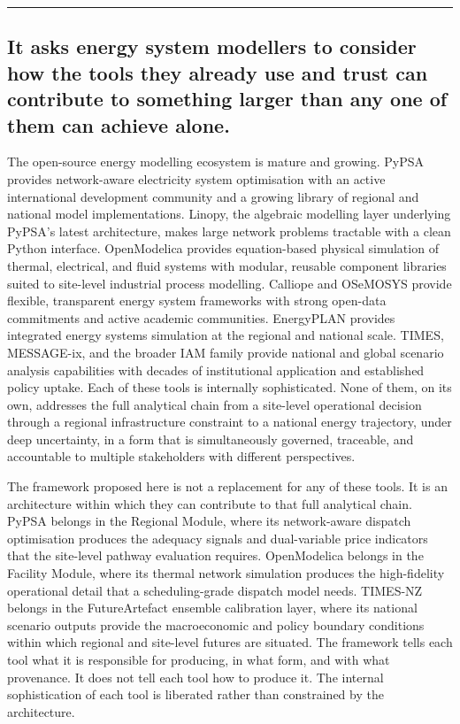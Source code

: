\documentclass[
  11pt,
  a4paper,
  twoside,
  openright]{scrbook}
\begin{document}
\begin{center}\rule{0.5\linewidth}{0.5pt}\end{center}

\subsection{It asks energy system modellers to consider how the tools
they already use and trust can contribute to something larger than any
one of them can achieve
alone.}\label{it-asks-energy-system-modellers-to-consider-how-the-tools-they-already-use-and-trust-can-contribute-to-something-larger-than-any-one-of-them-can-achieve-alone.}

The open-source energy modelling ecosystem is mature and growing. PyPSA
provides network-aware electricity system optimisation with an active
international development community and a growing library of regional
and national model implementations. Linopy, the algebraic modelling
layer underlying PyPSA's latest architecture, makes large network
problems tractable with a clean Python interface. OpenModelica provides
equation-based physical simulation of thermal, electrical, and fluid
systems with modular, reusable component libraries suited to site-level
industrial process modelling. Calliope and OSeMOSYS provide flexible,
transparent energy system frameworks with strong open-data commitments
and active academic communities. EnergyPLAN provides integrated energy
systems simulation at the regional and national scale. TIMES,
MESSAGE-ix, and the broader IAM family provide national and global
scenario analysis capabilities with decades of institutional application
and established policy uptake. Each of these tools is internally
sophisticated. None of them, on its own, addresses the full analytical
chain from a site-level operational decision through a regional
infrastructure constraint to a national energy trajectory, under deep
uncertainty, in a form that is simultaneously governed, traceable, and
accountable to multiple stakeholders with different perspectives.

The framework proposed here is not a replacement for any of these tools.
It is an architecture within which they can contribute to that full
analytical chain. PyPSA belongs in the Regional Module, where its
network-aware dispatch optimisation produces the adequacy signals and
dual-variable price indicators that the site-level pathway evaluation
requires. OpenModelica belongs in the Facility Module, where its thermal
network simulation produces the high-fidelity operational detail that a
scheduling-grade dispatch model needs. TIMES-NZ belongs in the
FutureArtefact ensemble calibration layer, where its national scenario
outputs provide the macroeconomic and policy boundary conditions within
which regional and site-level futures are situated. The framework tells
each tool what it is responsible for producing, in what form, and with
what provenance. It does not tell each tool how to produce it. The
internal sophistication of each tool is liberated rather than
constrained by the architecture.
\end{document}
